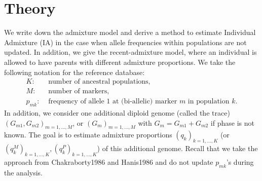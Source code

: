 \documentclass[12pt]{article}
\theoremstyle{definition}
\begin{document}
\section{Theory}
We write down the admixture model and derive a method to estimate
Individual Admixture (IA) in the case when allele frequencies within
populations are not updated. In addition, we give the recent-admixture
model, where an individual is allowed to have parents with different
admixture proportions. We take the following notation for the
reference database:
\begin{align*}
  K: & \text{ number of ancestral populations,}
  \\ M: & \text{ number of markers,}
  \\ p_{mk}: & \text{ frequency of allele 1 at (bi-allelic) marker $m$ in population $k$.}
\end{align*}
In addition, we consider one additional diploid genome (called the
trace) $(G_{m1}, G_{m2})_{m=1,...,M}$, or $(G_m)_{m=1,...,M}$ with
$G_m = G_{m1} + G_{m2}$ if phase is not known. The goal is to estimate
admixture proportions $(q_k)_{k=1,...,K}$ (or
$(q^M_{k})_{k=1,...,K}, (q^P_{k})_{k=1,...,K}$) of this additional
genome. Recall that we take the approach from
\cite{SI}{Chakraborty1986} and \cite{SI}{Hanis1986} and do
not update $p_{mk}$'s during the analysis.
\end{document}
